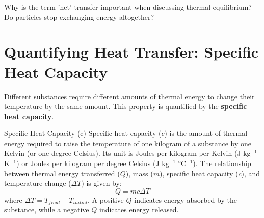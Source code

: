 \begin{stopandthink}
Why is the term 'net' transfer important when discussing thermal equilibrium? Do particles stop exchanging energy altogether?
\end{stopandthink}


\FloatBarrier

\section{Quantifying Heat Transfer: Specific Heat Capacity}
\label{sec:specific_heat}
\FloatBarrier

Different substances require different amounts of thermal energy to change their temperature by the same amount. This property is quantified by the \textbf{specific heat capacity}.

\begin{keyconcept}{Specific Heat Capacity (c)}
Specific heat capacity (\(c\)) is the amount of thermal energy required to raise the temperature of one kilogram of a substance by one Kelvin (or one degree Celsius). Its unit is Joules per kilogram per Kelvin (J kg\(^{-1}\) K\(^{-1}\)) or Joules per kilogram per degree Celsius (J kg\(^{-1}\) °C\(^{-1}\)). The relationship between thermal energy transferred (\(Q\)), mass (\(m\)), specific heat capacity (\(c\)), and temperature change (\(\Delta T\)) is given by:
\begin{equation}
Q = mc\Delta T
\label{eq:specific_heat}
\end{equation}
where \(\Delta T = T_{final} - T_{initial}\). A positive \(Q\) indicates energy absorbed by the substance, while a negative \(Q\) indicates energy released.
\end{keyconcept}



